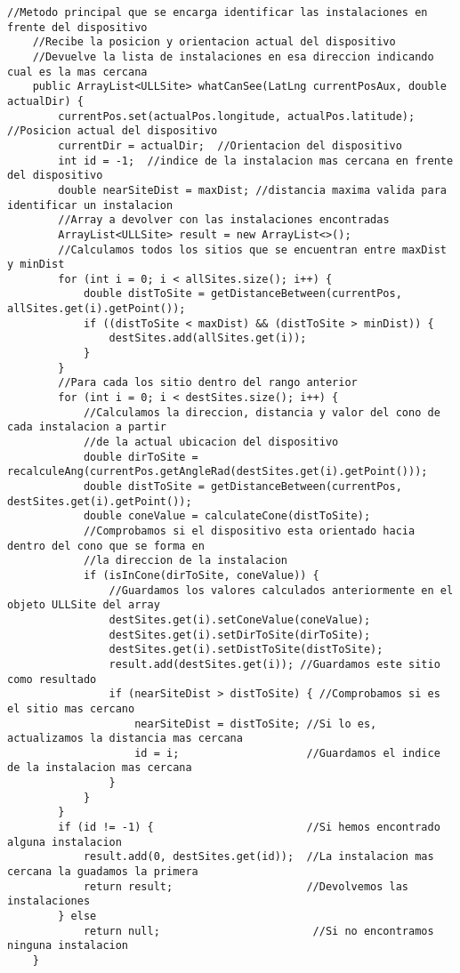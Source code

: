 \begin{lstlisting}[caption={Metodo principal que realiza el cálculo que permite reconocer las instalaciones en frente al dispositivo móvil.}, label={lst:whatCanSee}]
    //Metodo principal que se encarga identificar las instalaciones en frente del dispositivo
    //Recibe la posicion y orientacion actual del dispositivo
    //Devuelve la lista de instalaciones en esa direccion indicando cual es la mas cercana 
    public ArrayList<ULLSite> whatCanSee(LatLng currentPosAux, double actualDir) {
        currentPos.set(actualPos.longitude, actualPos.latitude); //Posicion actual del dispositivo
        currentDir = actualDir;  //Orientacion del dispositivo
        int id = -1;  //indice de la instalacion mas cercana en frente del dispositivo
        double nearSiteDist = maxDist; //distancia maxima valida para identificar un instalacion
        //Array a devolver con las instalaciones encontradas
        ArrayList<ULLSite> result = new ArrayList<>(); 
        //Calculamos todos los sitios que se encuentran entre maxDist y minDist
        for (int i = 0; i < allSites.size(); i++) {
            double distToSite = getDistanceBetween(currentPos, allSites.get(i).getPoint());
            if ((distToSite < maxDist) && (distToSite > minDist)) {
                destSites.add(allSites.get(i));
            }
        }
        //Para cada los sitio dentro del rango anterior 
        for (int i = 0; i < destSites.size(); i++) {  
            //Calculamos la direccion, distancia y valor del cono de cada instalacion a partir 
            //de la actual ubicacion del dispositivo
            double dirToSite = recalculeAng(currentPos.getAngleRad(destSites.get(i).getPoint()));
            double distToSite = getDistanceBetween(currentPos, destSites.get(i).getPoint());
            double coneValue = calculateCone(distToSite);
            //Comprobamos si el dispositivo esta orientado hacia dentro del cono que se forma en  
            //la direccion de la instalacion
            if (isInCone(dirToSite, coneValue)) { 
                //Guardamos los valores calculados anteriormente en el objeto ULLSite del array
                destSites.get(i).setConeValue(coneValue); 
                destSites.get(i).setDirToSite(dirToSite); 
                destSites.get(i).setDistToSite(distToSite); 
                result.add(destSites.get(i)); //Guardamos este sitio como resultado
                if (nearSiteDist > distToSite) { //Comprobamos si es el sitio mas cercano
                    nearSiteDist = distToSite; //Si lo es, actualizamos la distancia mas cercana
                    id = i;                    //Guardamos el indice de la instalacion mas cercana
                }
            }
        }
        if (id != -1) {                        //Si hemos encontrado alguna instalacion
            result.add(0, destSites.get(id));  //La instalacion mas cercana la guadamos la primera
            return result;                     //Devolvemos las instalaciones                   
        } else
            return null;                        //Si no encontramos ninguna instalacion
    }
\end{lstlisting}



